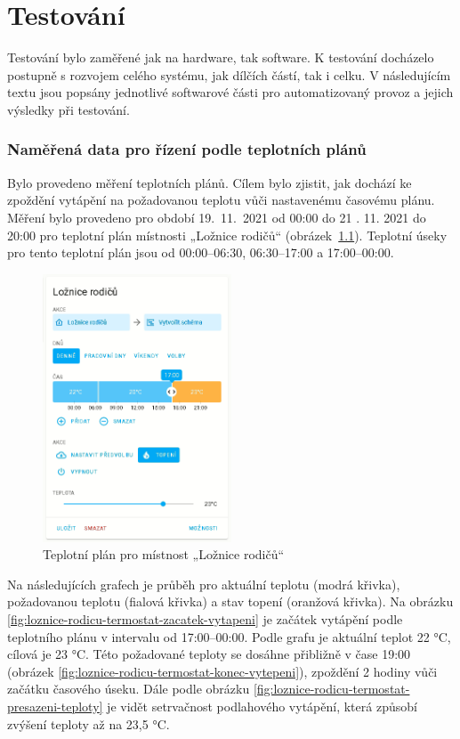\chapter{Testování}

Testování bylo zaměřené jak na hardware, tak software. K testování docházelo postupně s rozvojem celého systému, jak dílčích částí, tak i celku. V následujícím textu jsou popsány jednotlivé softwarové části pro automatizovaný provoz a jejich výsledky při testování.

\subsection{Naměřená data pro řízení podle teplotních plánů}

Bylo provedeno měření teplotních plánů. Cílem bylo zjistit, jak dochází ke zpoždění vytápění na požadovanou teplotu vůči nastavenému časovému plánu. Měření bylo provedeno pro období 19.~11.~2021 od 00:00 do 21 . 11. 2021 do 20:00 pro teplotní plán místnosti „Ložnice rodičů“ (obrázek~\ref{fig:teplotni-plan-loznice-rodicu}). Teplotní úseky pro tento teplotní plán jsou od 00:00–06:30, 06:30–17:00 a 17:00–00:00.

\begin{figure}[H]
    \centering
    \includegraphics[width=0.5\textwidth]{images/testovani/teplotni-plany/teplotni-plan-loznice-rodicu.png}
    \caption{Teplotní plán pro místnost „Ložnice rodičů“}
    \label{fig:teplotni-plan-loznice-rodicu}
\end{figure}

Na následujících grafech je průběh pro aktuální teplotu (modrá křivka), požadovanou teplotu (fialová křivka) a stav topení (oranžová křivka). Na obrázku \ref{fig:loznice-rodicu-termostat-zacatek-vytapeni} je začátek vytápění podle teplotního plánu v intervalu od 17:00–00:00. Podle grafu je aktuální teplot 22 °C, cílová je 23 °C. Této požadované teploty se dosáhne přibližně v čase 19:00 (obrázek \ref{fig:loznice-rodicu-termostat-konec-vytepeni}), zpoždění 2 hodiny vůči začátku časového úseku. Dále podle obrázku \ref{fig:loznice-rodicu-termostat-presazeni-teploty} je vidět setrvačnost podlahového vytápění, která způsobí zvýšení teploty až na 23,5 °C.



